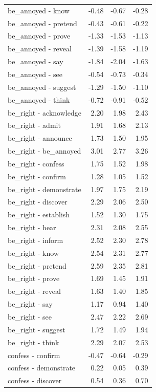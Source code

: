 \begin{longtable}{lrrr}
  be_annoyed - know & -0.48 & -0.67 & -0.28 \\ 
  be_annoyed - pretend & -0.43 & -0.61 & -0.22 \\ 
  be_annoyed - prove & -1.33 & -1.53 & -1.13 \\ 
  be_annoyed - reveal & -1.39 & -1.58 & -1.19 \\ 
  be_annoyed - say & -1.84 & -2.04 & -1.63 \\ 
  be_annoyed - see & -0.54 & -0.73 & -0.34 \\ 
  be_annoyed - suggest & -1.29 & -1.50 & -1.10 \\ 
  be_annoyed - think & -0.72 & -0.91 & -0.52 \\ 
  be_right - acknowledge & 2.20 & 1.98 & 2.43 \\ 
  be_right - admit & 1.91 & 1.68 & 2.13 \\ 
  be_right - announce & 1.73 & 1.50 & 1.95 \\ 
  be_right - be_annoyed & 3.01 & 2.77 & 3.26 \\ 
  be_right - confess & 1.75 & 1.52 & 1.98 \\ 
  be_right - confirm & 1.28 & 1.05 & 1.52 \\ 
  be_right - demonstrate & 1.97 & 1.75 & 2.19 \\ 
  be_right - discover & 2.29 & 2.06 & 2.50 \\ 
  be_right - establish & 1.52 & 1.30 & 1.75 \\ 
  be_right - hear & 2.31 & 2.08 & 2.55 \\ 
  be_right - inform & 2.52 & 2.30 & 2.78 \\ 
  be_right - know & 2.54 & 2.31 & 2.77 \\ 
  be_right - pretend & 2.59 & 2.35 & 2.81 \\ 
  be_right - prove & 1.69 & 1.45 & 1.91 \\ 
  be_right - reveal & 1.63 & 1.40 & 1.85 \\ 
  be_right - say & 1.17 & 0.94 & 1.40 \\ 
  be_right - see & 2.47 & 2.22 & 2.69 \\ 
  be_right - suggest & 1.72 & 1.49 & 1.94 \\ 
  be_right - think & 2.29 & 2.07 & 2.53 \\ 
  confess - confirm & -0.47 & -0.64 & -0.29 \\ 
  confess - demonstrate & 0.22 & 0.05 & 0.39 \\ 
  confess - discover & 0.54 & 0.36 & 0.70 \\ 

\end{longtable}
